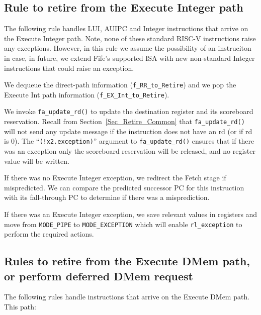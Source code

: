 
\subsection{Rule to retire from the Execute Integer path}

\label{Sec_Fife_Retire_Int}

The following rule handles LUI, AUIPC and Integer instructions that
arrive on the Execute Integer path.  Note, none of these standard
RISC-V instructions raise any exceptions.  However, in this rule we
assume the possibility of an instruciton in case, in future, we extend
Fife's supported ISA with new non-standard Integer instructions that
could raise an exception.


We dequeue the direct-path information (\verb|f_RR_to_Retire|) and we
pop the Execute Int path information (\verb|f_EX_Int_to_Retire|).

We invoke \verb|fa_update_rd()| to update the destination register and
its scoreboard reservation.  Recall from
Section~\ref{Sec_Retire_Common} that \verb|fa_update_rd()| will not
send any update message if the instruction does not have an rd (or if
rd is 0).  The ``\verb|(!x2.exception)|'' argument to
\verb|fa_update_rd()| ensures that if there was an exception only the
scoreboard reservation will be released, and no register value will be
written.

If there was no Execute Integer exception, we redirect the Fetch stage
if mispredicted.  We can compare the predicted successor PC for this
instruction with its fall-through PC to determine if there was a
misprediction.

If there was an Execute Integer exception, we save relevant values in
registers and move from \verb|MODE_PIPE| to \verb|MODE_EXCEPTION|
which will enable \verb|rl_exception| to perform the required actions.


\subsection{Rules to retire from the Execute DMem path, or perform deferred DMem request}

\label{Sec_Fife_S5_DMem}

The following rules handle instructions that arrive on the Execute
DMem path.  This path:

